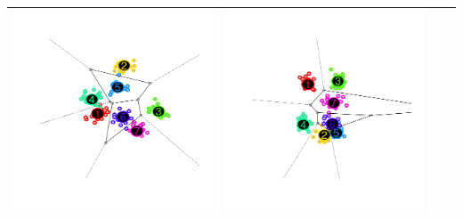 \documentclass{beamer}
\begin{document}
\begin{frame}
\begin{center}
\begin{tabular}{c|c|c|c}
\includegraphics[scale = 0.15, clip = true, trim = 0.6in 0.2in 0.6in 0.2in]{../info_theory_paper/gaussian_figure1b.png} &
\includegraphics[scale = 0.15, clip = true, trim = 0.6in 0.2in 0.6in 0.2in]{../info_theory_paper/gaussian_figure1c.png}\\\hline

\end{tabular}
\end{center}
\end{frame}
\end{document}

